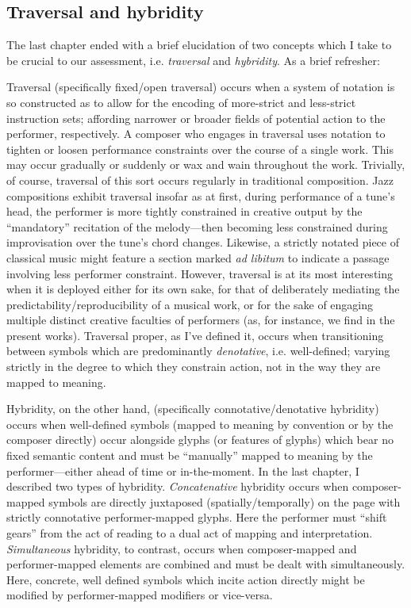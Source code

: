 \subsection{Traversal and hybridity}
    
        The last chapter ended with a brief elucidation of two concepts which I take to be crucial to our assessment, i.e. \textit{traversal} and \textit{hybridity}. As a brief refresher:
    
        Traversal (specifically fixed/open traversal) occurs when a system of notation is so constructed as to allow for the encoding of more-strict and less-strict instruction sets; affording narrower or broader fields of potential action to the performer, respectively. A composer who engages in traversal uses notation to tighten or loosen performance constraints over the course of a single work. This may occur gradually or suddenly or wax and wain throughout the work. Trivially, of course, traversal of this sort occurs regularly in traditional composition. Jazz compositions exhibit traversal insofar as at first, during performance of a tune's head, the performer is more tightly constrained in creative output by the ``mandatory'' recitation of the melody---then becoming less constrained during improvisation over the tune's chord changes. Likewise, a strictly notated piece of classical music might feature a section marked \textit{ad libitum} to indicate a passage involving less performer constraint. However, traversal is at its most interesting when it is deployed either for its own sake, for that of deliberately mediating the predictability/reproducibility of a musical work, or for the sake of engaging multiple distinct creative faculties of performers (as, for instance, we find in the present works). Traversal proper, as I've defined it, occurs when transitioning between symbols which are predominantly \textit{denotative}, i.e. well-defined; varying strictly in the degree to which they constrain action, not in the way they are mapped to meaning.

        Hybridity, on the other hand, (specifically connotative/denotative hybridity) occurs when well-defined symbols (mapped to meaning by convention or by the composer directly) occur alongside glyphs (or features of glyphs) which bear no fixed semantic content and must be ``manually'' mapped to meaning by the performer---either ahead of time or in-the-moment. In the last chapter, I described two types of hybridity. \textit{Concatenative} hybridity occurs when composer-mapped symbols are directly juxtaposed (spatially/temporally) on the page with strictly connotative performer-mapped glyphs. Here the performer must ``shift gears'' from the act of reading to a dual act of mapping and interpretation. \textit{Simultaneous} hybridity, to contrast, occurs when composer-mapped and performer-mapped elements are combined and must be dealt with simultaneously. Here, concrete, well defined symbols which incite action directly might be modified by performer-mapped modifiers or vice-versa. 


